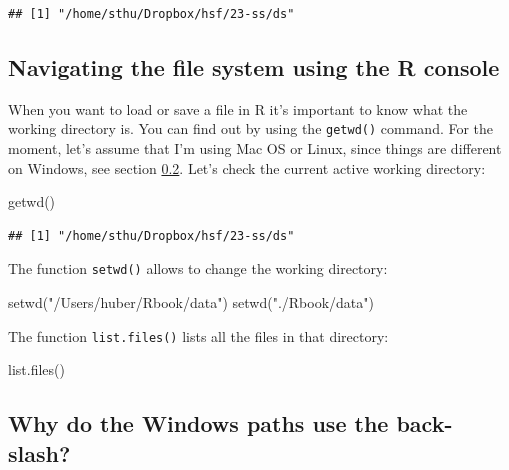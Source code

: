 \documentclass[
  12pt,
  oneside]{book}
\newenvironment{Shaded}{\begin{snugshade}}{\end{snugshade}}
\newcommand{\FunctionTok}[1]{\textcolor[rgb]{0.00,0.00,0.00}{#1}}
\newcommand{\NormalTok}[1]{#1}
\newcommand{\StringTok}[1]{\textcolor[rgb]{0.31,0.60,0.02}{#1}}
\theoremstyle{definition}
\theoremstyle{definition}
\theoremstyle{definition}
\theoremstyle{definition}
\theoremstyle{remark}
\begin{document}
\begin{verbatim}
## [1] "/home/sthu/Dropbox/hsf/23-ss/ds"
\end{verbatim}

\hypertarget{sec:navigationR}{%
\subsection{Navigating the file system using the R console}\label{sec:navigationR}}

When you want to load or save a file in R it's important to know what the working directory is. You can find out by using the \texttt{getwd()} command. For the moment, let's assume that I'm using Mac OS or Linux, since things are different on Windows, see section \ref{sec:winbackslash}.
Let's check the current active working directory:

\begin{Shaded}
\begin{Highlighting}[]
\FunctionTok{getwd}\NormalTok{()}
\end{Highlighting}
\end{Shaded}

\begin{verbatim}
## [1] "/home/sthu/Dropbox/hsf/23-ss/ds"
\end{verbatim}

The function \texttt{setwd()} allows to change the working directory:

\begin{Shaded}
\begin{Highlighting}[]
\FunctionTok{setwd}\NormalTok{(}\StringTok{"/Users/huber/Rbook/data"}\NormalTok{)}
\FunctionTok{setwd}\NormalTok{(}\StringTok{"./Rbook/data"}\NormalTok{)}
\end{Highlighting}
\end{Shaded}

The function \texttt{list.files()} lists all the files in that directory:

\begin{Shaded}
\begin{Highlighting}[]
\FunctionTok{list.files}\NormalTok{()}
\end{Highlighting}
\end{Shaded}

\hypertarget{sec:winbackslash}{%
\subsection{Why do the Windows paths use the back-slash?}\label{sec:winbackslash}}
\end{document}
